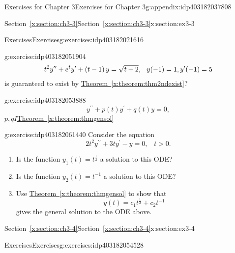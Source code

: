 \documentclass[oneside,10pt,]{book}
\newcommand{\xreffont}{\relax}
\numberwithin{equation}{section}
\numberwithin{equation}{section}
\begin{document}
\begin{appendixptx}{Exercises for Chapter 3}{}{Exercises for Chapter 3}{}{}{g:appendix:idp403182037808}
\begin{sectionptx}{Section~{\xreffont\ref*{x:section:ch3-3}}}{}{Section~{\xreffont\ref*{x:section:ch3-3}}}{}{}{x:section:ex3-3}
\begin{exercises-subsection-numberless}{Exercises}{}{Exercises}{}{}{g:exercises:idp403182021616}
\begin{divisionexercise}{2}{}{}{g:exercise:idp403182051904}
\begin{equation*}
t^{2}y^{\prime\prime}+e^{t}y^{\prime}+\left(t-1\right)y=\sqrt{t+2}, \hspace{.1in}
y(-1)=1,y^{\prime}(-1)=5
\end{equation*}
is guaranteed to exist by \hyperref[x:theorem:thm2ndexist]{Theorem~{\xreffont\ref{x:theorem:thm2ndexist}}}?%
\end{divisionexercise}%
\begin{divisionexercise}{3}{}{}{g:exercise:idp403182053888}%
%
\begin{equation*}
y^{\prime\prime}+p(t)y^{\prime}+q(t)y=0,
\end{equation*}
\(p,q\)\(I\)\hyperref[x:theorem:thmgensol]{Theorem~{\xreffont\ref{x:theorem:thmgensol}}}\end{divisionexercise}%
\begin{divisionexercise}{4}{}{}{g:exercise:idp403182061440}%
Consider the equation%
\begin{equation*}
2t^{2}y^{\prime\prime}+3ty^{\prime}-y=0,\,\,\,\,\,t>0.
\end{equation*}
%
%
\begin{enumerate}[label=(\alph*)]
\item{}Is the function \(y_{1}(t)=t^{\frac{1}{2}}\) a solution to this ODE?%
\item{}Is the function \(y_{2}(t)=t^{-1}\) a solution to this ODE?%
\item{}Use \hyperref[x:theorem:thmgensol]{Theorem~{\xreffont\ref{x:theorem:thmgensol}}} to show that%
\begin{equation*}
y(t)=c_{1}t^{\frac{1}{2}}+c_{2}t^{-1}
\end{equation*}
gives the general solution to the ODE above.%
\end{enumerate}
\end{divisionexercise}%
\end{exercises-subsection-numberless}
\end{sectionptx}
%
%
\typeout{************************************************}
\typeout{Section D.3 Section~{\xreffont\ref*{x:section:ch3-4}}}
\typeout{************************************************}
%
\begin{sectionptx}{Section~{\xreffont\ref*{x:section:ch3-4}}}{}{Section~{\xreffont\ref*{x:section:ch3-4}}}{}{}{x:section:ex3-4}
%
%
\typeout{************************************************}
\typeout{************************************************}
%
\begin{exercises-subsection-numberless}{Exercises}{}{Exercises}{}{}{g:exercises:idp403182054528}

\end{exercises-subsection-numberless}
\end{sectionptx}
\end{appendixptx}
\end{document}
